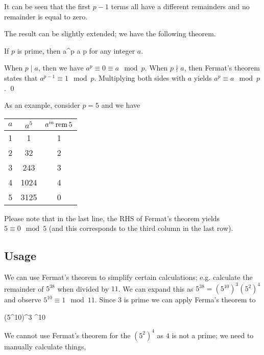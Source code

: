 \vspace{3mm}

It can be seen that the first $p-1$ terms all have a different remainders and no remainder is equal to zero.


The result can be slightly extended; we have the following theorem.

\begin{theorem}
    If $p$ is prime, then 
    \bee
    a^p \equiv a \mod p
    \eee
    for any integer $a$.
\end{theorem}

When $p \mid a$, then we have $a^p \equiv 0 \equiv a \mod p$. When $p \nmid a$, then Fermat's theorem states that $a^{p-1} \equiv 1 \mod p$. Multiplying both sides with $a$ yields $a^p \equiv a \mod p$. \qed

As an example, consider $p = 5$ and we have

\vspace{3mm}

\begin{tabular}{|ccc|} \hline
    $a$ & $a^5$ & $a^m \operatorname{rem} 5$ \\ \hline
    1 & 1 & 1     \\
    2 & 32 & 2    \\
    3 & 243 & 3    \\
    4 & 1024 & 4  \\
    5 & 3125 & 0  \\ \hline
\end{tabular}

\vspace{3mm}

Please note that in the last line, the RHS of Fermat's theorem yields $5 \equiv 0 \mod 5$ (and this corresponds to the third column in the last row).

\subsection{Usage}

We can use Fermat's theorem to simplify certain calculations; e.g. calculate the remainder of $5^{38}$ when divided by $11$. We can expand this as $5^{38} = (5^{10})^3 (5^2)^4$ and observe $5^{10} \equiv 1 \mod 11$. Since $3$ is prime we can apply Ferma's theorem to

\bee
(5^{10})^3 ^{10}  
\eee

We cannot use Fermat's theorem for the $(5^2)^4$ as $4$ is not a prime; we need to manually calculate things,

